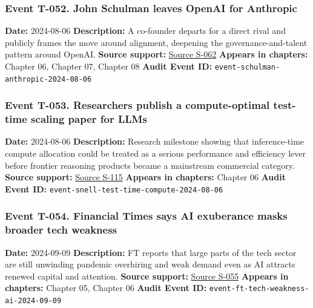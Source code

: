 \documentclass[
  american,
  11pt,
  letterpaper,
]{article}
\begin{document}
\subsubsection{Event T-052. John Schulman leaves OpenAI for
Anthropic}\label{event-t-052-john-schulman-leaves-openai-for-anthropic}

\textbf{Date:} 2024-08-06 \textbf{Description:} A co-founder departs for
a direct rival and publicly frames the move around alignment, deepening
the governance-and-talent pattern around OpenAI. \textbf{Source
support:}
\hyperref[source-s-062-openai-co-founder-departs-for-rival-anthropic]{Source
S-062} \textbf{Appears in chapters:} Chapter 06, Chapter 07, Chapter 08
\textbf{Audit Event ID:} \texttt{event-schulman-anthropic-2024-08-06}

\subsubsection{Event T-053. Researchers publish a compute-optimal
test-time scaling paper for
LLMs}\label{event-t-053-researchers-publish-a-compute-optimal-test-time-scaling-paper-for-llms}

\textbf{Date:} 2024-08-06 \textbf{Description:} Research milestone
showing that inference-time compute allocation could be treated as a
serious performance and efficiency lever before frontier reasoning
products became a mainstream commercial category. \textbf{Source
support:}
\hyperref[source-s-115-scaling-llm-test-time-compute-optimally-can-be-more-effective-than-scaling-model-parameters]{Source
S-115} \textbf{Appears in chapters:} Chapter 06 \textbf{Audit Event ID:}
\texttt{event-snell-test-time-compute-2024-08-06}

\subsubsection{Event T-054. Financial Times says AI exuberance masks
broader tech
weakness}\label{event-t-054-financial-times-says-ai-exuberance-masks-broader-tech-weakness}

\textbf{Date:} 2024-09-09 \textbf{Description:} FT reports that large
parts of the tech sector are still unwinding pandemic overhiring and
weak demand even as AI attracts renewed capital and attention.
\textbf{Source support:}
\hyperref[source-s-055-ai-exuberance-masks-broad-weakness-in-tech-sector-say-investors]{Source
S-055} \textbf{Appears in chapters:} Chapter 05, Chapter 06
\textbf{Audit Event ID:} \texttt{event-ft-tech-weakness-ai-2024-09-09}
\end{document}

